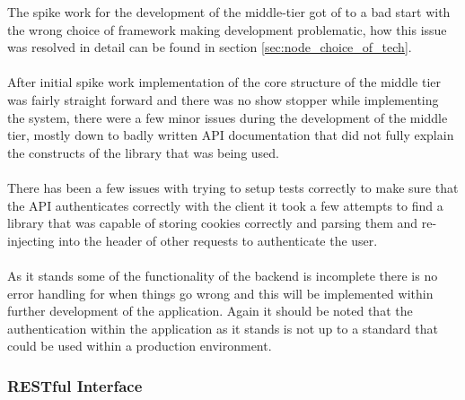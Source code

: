The spike work for the development of the middle-tier got of to a bad start with the wrong choice of framework making development problematic, how this issue was resolved in detail can be found in section \ref{sec:node_choice_of_tech}.\\
\\
After initial spike work implementation of the core structure of the middle tier was fairly straight forward and there was no show stopper while implementing the system, there were a few minor issues during the development of the middle tier, mostly down to badly written API documentation that did not fully explain the constructs of the library that was being used.\\
\\
There has been a few issues with trying to setup tests correctly to make sure that the API authenticates correctly with the client it took a few attempts to find a library that was capable of storing cookies correctly and parsing them and re-injecting into the header of other requests to authenticate the user.\\
\\
As it stands some of the functionality of the backend is incomplete there is no error handling for when things go wrong and this will be implemented within further development of the application. Again it should be noted that the authentication within the application as it stands is not up to a standard that could be used within a production environment.
\\

\subsubsection{RESTful Interface}

